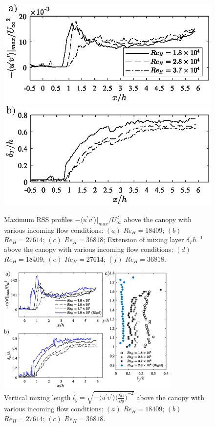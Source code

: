\documentclass[lineno,authoryear]{FLO_v1}%
\theoremstyle{definition}
\begin{document}
\begin{figure}
	\centering
		\includegraphics[width=0.49\linewidth]{rssmax}
		\includegraphics[width=0.49\linewidth]{thickness}
	\caption{Maximum RSS profiles $-\langle u^{\prime} v^{\prime} \rangle |_{max}/  U_{\infty}^{2}$ above the canopy with various incoming flow conditions: $(a)$ $Re_H = 18409$; $(b)$ $Re_H = 27614$; $(c)$ $Re_H = 36818$; Extension of mixing layer $\delta_T h^{-1}$ above the canopy with various incoming flow conditions: $(d)$ $Re_H = 18409$; $(e)$ $Re_H = 27614$; $(f)$ $Re_H = 36818$.}
	\label{RSSmaxthickness}
\end{figure}

 

\begin{figure}
	\centerline{\includegraphics[width=0.8\textwidth]{MixingLength}}
	\caption{Vertical mixing length $l_y = \sqrt{-\langle u^{\prime}v^{\prime}  \rangle {\big( \frac{\partial U}{\partial y} \big)}^{-2}}$ above the canopy with various incoming flow conditions: $(a)$ $Re_H = 18409$; $(b)$ $Re_H = 27614$; $(c)$ $Re_H = 36818$.}
	\label{mixinglength}
\end{figure}
\end{document}
